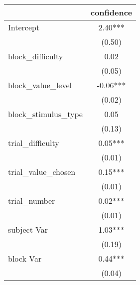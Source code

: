 \begin{table}
\caption{}
\begin{center}
\begin{tabular}{lc}
\hline
                      & confidence  \\
\midrule
Intercept             & 2.40***     \\
                      & (0.50)      \\
block\_difficulty     & 0.02        \\
                      & (0.05)      \\
block\_value\_level   & -0.06***    \\
                      & (0.02)      \\
block\_stimulus\_type & 0.05        \\
                      & (0.13)      \\
trial\_difficulty     & 0.05***     \\
                      & (0.01)      \\
trial\_value\_chosen  & 0.15***     \\
                      & (0.01)      \\
trial\_number         & 0.02***     \\
                      & (0.01)      \\
subject Var           & 1.03***     \\
                      & (0.19)      \\
block Var             & 0.44***     \\
                      & (0.04)      \\
\hline
\end{tabular}
\end{center}
\end{table}